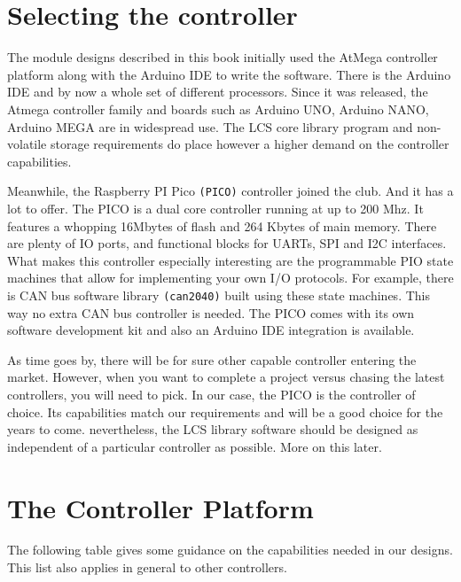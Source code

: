 \section{Selecting the controller}

The module designs described in this book initially used the AtMega controller platform along with the Arduino IDE to write the software. There is the Arduino IDE and by now a whole set of different processors. Since it was released, the Atmega controller family and boards such as Arduino UNO, Arduino NANO, Arduino MEGA are in widespread use. The LCS core library program and non-volatile storage requirements do place however a higher demand on the controller capabilities.

Meanwhile, the Raspberry PI Pico \texttt{(PICO)} controller joined the club. And it has a lot to offer. The PICO is a dual core controller running at up to 200 Mhz. It features a whopping 16Mbytes of flash and 264 Kbytes of main memory. There are plenty of IO ports, and functional blocks for UARTs, SPI and I2C interfaces. What makes this controller especially interesting are the programmable PIO state machines that allow for implementing your own I/O protocols. For example, there is CAN bus software library \texttt{(can2040)} built using these state machines. This way no extra CAN bus controller is needed. The PICO comes with its own software development kit and also an Arduino IDE integration is available.

As time goes by, there will be for sure other capable controller entering the market. However, when you want to complete a project versus chasing the latest controllers, you will need to pick. In our case, the PICO is the controller of choice. Its capabilities match our requirements and will be a good choice for the years to come. nevertheless, the LCS library software should be designed as independent of a particular controller as possible. More on this later. 

\section{The Controller Platform}

 The following table gives some guidance on the capabilities needed in our designs. This list also applies in general to other controllers.

